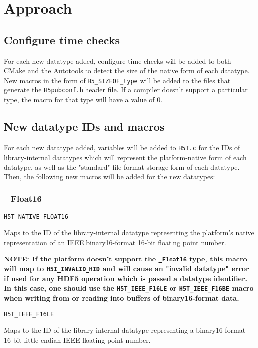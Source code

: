 \documentclass[../HDF5_RFC.tex]{subfiles}
\begin{document}
\section{Approach}
\label{approach}

\subsection{Configure time checks}

For each new datatype added, configure-time checks will be added to both CMake and the Autotools to
detect the size of the native form of each datatype. New macros in the form of \texttt{H5\_SIZEOF\_type}
will be added to the files that generate the \texttt{H5pubconf.h} header file. If a compiler doesn't
support a particular type, the macro for that type will have a value of $0$.

\subsection{New datatype IDs and macros}

For each new datatype added, variables will be added to \texttt{H5T.c} for the IDs of library-internal
datatypes which will represent the platform-native form of each datatype, as well as the "standard" file
format storage form of each datatype. Then, the following new macros will be added for the new datatypes:

\subsubsection{\_Float16}

\texttt{H5T\_NATIVE\_FLOAT16}

Maps to the ID of the library-internal datatype representing the platform's native representation
of an IEEE binary16-format 16-bit floating point number.

\textbf{NOTE: If the platform doesn't support the \texttt{\_Float16} type, this macro will map to
\texttt{H5I\_INVALID\_HID} and will cause an "invalid datatype" error if used for any HDF5 operation
which is passed a datatype identifier. In this case, one should use the \texttt{H5T\_IEEE\_F16LE} or
\texttt{H5T\_IEEE\_F16BE} macro when writing from or reading into buffers of binary16-format data.}

\texttt{H5T\_IEEE\_F16LE}

Maps to the ID of the library-internal datatype representing a binary16-format 16-bit
little-endian IEEE floating-point number.
\end{document}
